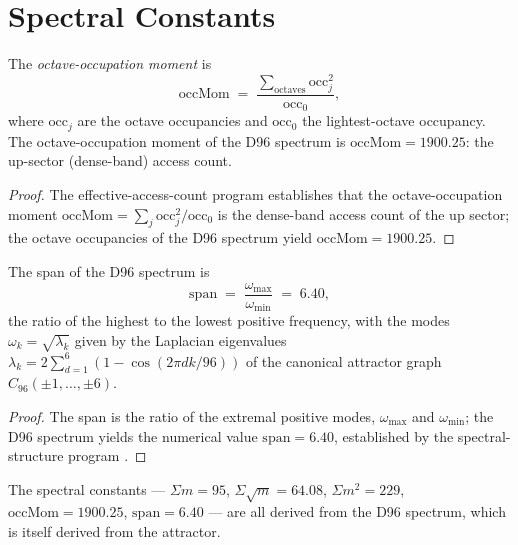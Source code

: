 \section{Spectral Constants}
\label{c06:sec:spectral-constants}

\begin{theorem}
\label{c06:thm:occmom}
The \emph{octave-occupation moment} is
\begin{equation}
\label{c06:eq:occmom}
\mathrm{occMom} \;=\; \frac{\sum_{\text{octaves}} \mathrm{occ}_j^2}{\mathrm{occ}_0},
\end{equation}
where $\mathrm{occ}_j$ are the octave occupancies and $\mathrm{occ}_0$ the lightest-octave
occupancy. The octave-occupation moment of the D96 spectrum is
$\mathrm{occMom} = 1900.25$: the up-sector (dense-band) access count.
\end{theorem}

\begin{proof}
The effective-access-count program \cite{c06:QG157} establishes that the octave-occupation
moment $\mathrm{occMom} = \sum_j \mathrm{occ}_j^2/\mathrm{occ}_0$ is the dense-band access
count of the up sector; the octave occupancies of the D96 spectrum yield
$\mathrm{occMom} = 1900.25$.
\end{proof}

\begin{theorem}
\label{c06:thm:span}
The span of the D96 spectrum is
\begin{equation}
\label{c06:eq:span}
\mathrm{span} \;=\; \frac{\omega_{\max}}{\omega_{\min}} \;=\; 6.40,
\end{equation}
the ratio of the highest to the lowest positive frequency, with the modes
$\omega_k=\sqrt{\lambda_k}$ given by the Laplacian eigenvalues
$\lambda_k = 2\sum_{d=1}^{6}(1-\cos(2\pi dk/96))$ of the canonical attractor graph
$C_{96}(\pm1,\ldots,\pm6)$.
\end{theorem}

\begin{proof}
The span is the ratio of the extremal positive modes, $\omega_{\max}$ and $\omega_{\min}$;
the D96 spectrum yields the numerical value $\mathrm{span} = 6.40$, established by the
spectral-structure program \cite{c06:QG155}.
\end{proof}

\begin{corollary}
\label{c06:cor:constants-derived}
The spectral constants --- $\Sigma m=95$, $\Sigma\sqrt{m}=64.08$, $\Sigma m^2=229$,
$\mathrm{occMom}=1900.25$, $\mathrm{span}=6.40$ --- are all derived from the D96 spectrum,
which is itself derived from the attractor.
\end{corollary}

